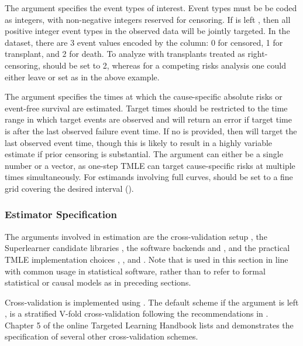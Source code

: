 \documentclass{report}
\newcommand{\1}{\ensuremath{\mathbf{1}}}
\begin{document}
The  argument specifies the event types of interest. Event types must be be coded as integers, with non-negative integers reserved for censoring. If  is left , then all positive integer event types in the observed data will be jointly targeted. In the  dataset, there are 3 event values encoded by the column: 0 for censored, 1 for transplant, and 2 for death. To analyze  with transplants treated as right-censoring,  should be set to 2, whereas for a competing risks analysis one could either leave  or set  as in the above example.

The  argument specifies the times at which the cause-specific absolute risks or event-free survival are estimated. Target times should be restricted to the time range in which target events are observed and  will return an error if target time is after the last observed failure event time. If no  is provided, then  will target the last observed event time, though this is likely to result in a highly variable estimate if prior censoring is substantial. The  argument can either be a single number or a vector, as one-step TMLE can target cause-specific risks at multiple times simultaneously. For estimands involving full curves,  should be set to a fine grid covering the desired interval (\cite{rytgaard_estimation_2021}).

\subsubsection{Estimator Specification}
\label{EstimationSpec}
The  arguments involved in estimation are the cross-validation setup , the Superlearner candidate libraries , the software backends  and , and the practical TMLE implementation choices , , and . Note that  is used in this section in line with common usage in statistical software, rather than to refer to formal statistical or causal models as in preceding sections. 

Cross-validation is implemented using . The default scheme if the  argument is left , is a stratified V-fold cross-validation following the recommendations in \cite{phillips_practical_2022}. Chapter 5 of the online Targeted Learning Handbook lists and demonstrates the specification of several other cross-validation schemes.
\end{document}
